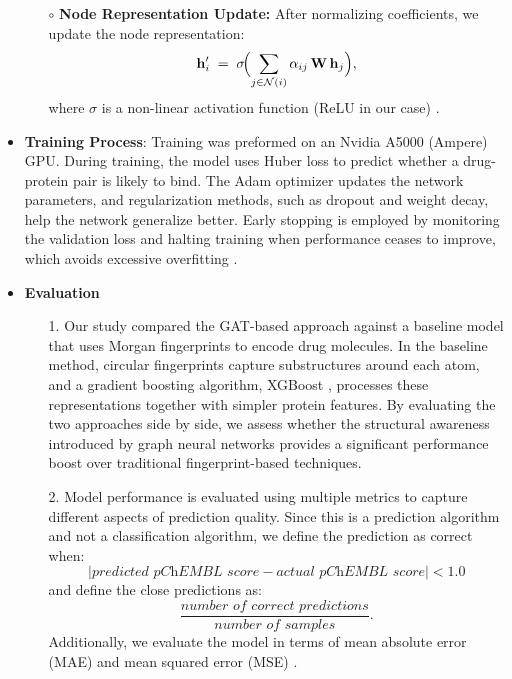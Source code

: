 \documentclass[fontsize=11pt]{article}
\begin{document}
\begin{itemize}
\begin{itemize}
            \item[$\circ$] \textbf{Node Representation Update:} After normalizing coefficients, we update the node representation: 
            \[
                \mathbf{h}_i' \;=\;
                \sigma\!\Bigl(\sum_{j \in \mathcal{N}(i)}
                      \alpha_{ij}\,\mathbf{W}\,\mathbf{h}_j\Bigr),
            \]
            where $\sigma$ is a non-linear activation function (ReLU in our case) \cite{Velickovic2018}.
        \end{itemize}

    \item \textbf{Training Process}: Training was preformed on an Nvidia A5000 (Ampere) GPU. During training, the model uses Huber loss to predict whether a drug-protein pair is likely to bind. The Adam optimizer updates the network parameters, and regularization methods, such as dropout and weight decay, help the network generalize better. Early stopping is employed by monitoring the validation loss and halting training when performance ceases to improve, which avoids excessive overfitting \cite{Chen2016}.\\

    \item \textbf{Evaluation}
    \begin{itemize}
        \item[1.] Our study compared the GAT-based approach against a baseline model that uses Morgan fingerprints \cite{Rogers2010} to encode drug molecules. In the baseline method, circular fingerprints capture substructures around each atom, and a gradient boosting algorithm, XGBoost \cite{ChenGuestrin2016}, processes these representations together with simpler protein features. By evaluating the two approaches side by side, we assess whether the structural awareness introduced by graph neural networks provides a significant performance boost over traditional fingerprint-based techniques.
        \item[2.] Model performance is evaluated using multiple metrics to capture different aspects of prediction quality. Since this is a prediction algorithm and not a classification algorithm, we define the prediction as correct when:
        \[
        |\textit{predicted pChEMBL score} - \textit{actual pChEMBL score}| < 1.0
        \]
        and define the close predictions as:
        \[
        \frac{\textit{number of correct predictions}}{\textit{number of samples}}.
        \]
        Additionally, we evaluate the model in terms of mean absolute error (MAE) and mean squared error (MSE) \cite{Chen2016}.
        

\end{itemize}
\end{itemize}
\end{document}
